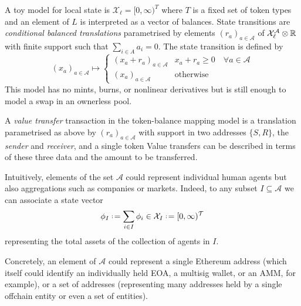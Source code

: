 \documentclass[a4paper,11pt]{article}
\begin{document}
\begin{example}
\label{token-balance-model}
  
  A toy model for local state is $\mathcal{X}_\ell=[0,\infty)^T$ where $T$ is a fixed set of token types and an element of $L$ is interpreted as a vector of balances.
  State transitions are \emph{conditional balanced translations} parametrised by elements $(r_a)_{a\in\mathcal{A}}$ of $\mathcal{X}_\ell^\mathcal{A}\otimes \mathbb R$ with finite support such that $\sum_{i\in A}a_i=0$. 
  The state transition is defined by
  \[
    (x_a)_{a\in\mathcal{A}} \mapsto 
    \left\{\begin{array}{ll} 
      (x_a+r_a)_{a\in\mathcal{A}} & x_a+r_a \geq 0 \quad \forall a\in\mathcal{A} \\ 
      (x_a)_{a\in\mathcal{A}} & \text{otherwise} 
    \end{array}\right. 
  \]
  This model has no mints, burns, or nonlinear derivatives but is still enough to model a swap in an ownerless pool.
  
\end{example}

\begin{example}
\label{value-transfer}

  A \emph{value transfer} transaction in the token-balance mapping model is a translation parametrised as above by $(r_a)_{a\in\mathcal{A}}$ with support in two addresses $\{S,R\}$, the \emph{sender} and \emph{receiver}, and a single token %
  Value transfers can be described in terms of these three data and the amount to be transferred.
  
\end{example}

\begin{remark}
  
  Intuitively, elements of the set $\mathcal{A}$ could represent individual human agents but also aggregations such as companies or markets. Indeed, to any subset $I\subseteq\mathcal{A}$ we can associate a state vector 
  \[
    \phi_I\defeq \sum_{i\in I}\phi_i \in \mathcal{X}_I\defeq [0,\infty)^{\mathcal{T}}
  \]
  representing the total assets of the collection of agents in $I$.
  
  Concretely, an element of $\mathcal{A}$ could represent a single Ethereum address (which itself could identify an individually held EOA, a multisig wallet, or an AMM, for example), or a set of addresses (representing many addresses held by a single offchain entity or even a set of entities).
  
\end{remark}
\end{document}
